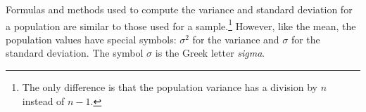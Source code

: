 \begin{doublespace}
Formulas and methods used to compute the variance and standard deviation for a population are similar to those used for a sample.\footnote{The only difference is that the population variance has a division by $n$ instead of $n-1$.} However, like the mean, the population values have special symbols: $\sigma_{}^2$ for the variance and $\sigma$ for the standard deviation. The symbol $\sigma$  is the Greek letter \emph{sigma}.

\end{doublespace}
